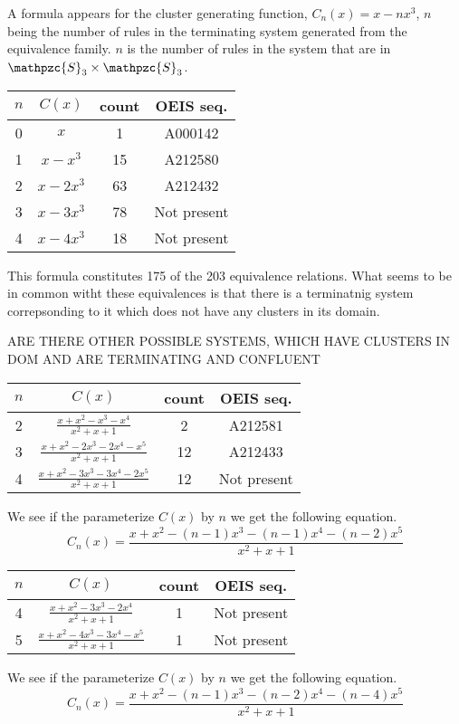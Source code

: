 \documentclass[a4paper, 11pt]{article}
\theoremstyle{definition}
\newcommand{\Sym}{\mathpzc{S}}
\begin{document}
A formula appears for the cluster generating function, $C_n(x) = x-nx^3$, $n$ being the number of rules
in the terminating system generated from the equivalence family. $n$ is the
number of rules in the system that are in $\Sym_3 \times \Sym_3$.
\begin{center}
\begin{tabular}{c|c|c|c}
    $n$ & $C(x)$ & count & OEIS seq. \\
    \hline
    0 & $x$ & 1 & A000142 \\
    1 & $x-x^3$ & 15 & A212580 \\
    2 & $x-2x^3$ & 63 & A212432 \\
    3 & $x-3x^3$ & 78 & Not present \\
    4 & $x-4x^3$ & 18 & Not present \\
\end{tabular}
\end{center}
This formula constitutes 175 of the 203 equivalence relations.
What seems to be in common witht these equivalences is that there is a
terminatnig system correpsonding to it which does not have any clusters in its
domain. 

ARE THERE OTHER POSSIBLE SYSTEMS, WHICH HAVE CLUSTERS IN DOM AND ARE TERMINATING AND
CONFLUENT 

\begin{center}
\begin{tabular}{c|c|c|c}
    $n$ & $C(x)$ & count & OEIS seq. \\
    \hline
    2 & $\frac{x+x^2-x^3-x^4}{x^2+x+1}$ & 2 & A212581 \\
    3 & $\frac{x+x^2-2x^3-2x^4-x^5}{x^2+x+1}$ & 12 & A212433 \\
    4 & $\frac{x+x^2-3x^3-3x^4-2x^5}{x^2+x+1}$ & 12 & Not present\\
\end{tabular}
\end{center}
We see if the parameterize $C(x)$ by $n$ we get the following equation.
\[
    C_n(x) = \frac{x+x^2-(n-1)x^3-(n-1)x^4-(n-2)x^5}{x^2+x+1}
\]

\begin{center}
\begin{tabular}{c|c|c|c}
    $n$ & $C(x)$ & count & OEIS seq. \\
    \hline
    4 & $\frac{x+x^2-3x^3-2x^4}{x^2+x+1}$ & 1 & Not present \\ 
    5 & $\frac{x+x^2-4x^3-3x^4-x^5}{x^2+x+1}$ & 1 & Not present\\
\end{tabular}
\end{center}
We see if the parameterize $C(x)$ by $n$ we get the following equation.
\[
    C_n(x) = \frac{x+x^2-(n-1)x^3-(n-2)x^4-(n-4)x^5}{x^2+x+1}
\]
\end{document}
